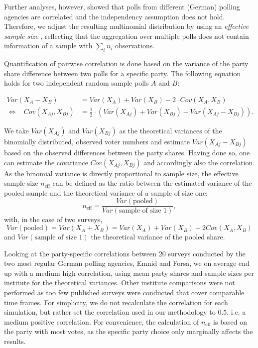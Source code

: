 \documentclass[smallcondensed]{svjour3}     %
\begin{document}
Further analyses, however, showed that polls from different (German)
polling agencies are correlated
and the independency assumption does not hold.
Therefore, we adjust the resulting multinomial
distribution by using an \textit{effective sample size} \citep{hanley_2003},
reflecting that the aggregation over multiple polls does not contain 
information of a sample with $\sum_i n_i$ observations.

Quantification of pairwise correlation is done based on the variance of the
party share difference between two polls for a specific party.
The following equation holds for two independent
random sample polls $A$ and $B$:

\begin{equation}
\begin{aligned}
Var(X_A - X_B) &= Var(X_A) + Var(X_B) - 2 \cdot Cov(X_A, X_B) \\
\Leftrightarrow \ \ \ \ Cov(X_{Aj}, X_{Bj}) &= \frac{1}{2} \cdot \left(Var(X_{Aj}) + Var(X_{Bj}) - Var(X_{Aj} - X_{Bj}) \right).
\end{aligned}
\end{equation}

We take $Var(X_{Aj})$ and $Var(X_{Bj})$ as the theoretical variances of the binomially distributed, observed voter numbers and estimate $Var(X_{Aj} - X_{Bj})$ based on the observed differences between the party shares. Having done so, one can estimate the covariance $Cov(X_{Aj}, X_{Bj})$ and accordingly also the correlation. As the binomial variance is directly proportional to sample size, the effective sample size $n_{\text{eff}}$ can be defined as the ratio between the estimated variance of the pooled sample and the theoretical variance of a sample of size one:
$$
n_{\text{eff}} = \frac{Var(\text{pooled})}{Var(\text{sample of size 1})},
$$
with, in the case of two surveys,
$$
Var(\text{pooled}) = Var(X_A + X_B) = Var(X_A) + Var(X_B) + 2 Cov(X_A,X_B)
$$
and $Var(\text{sample of size 1})$ the theoretical variance of the pooled share.

Looking at the party-specific correlations between 20 surveys conducted by the two most regular German polling agencies, Emnid and Forsa, we on average end up with a medium high correlation, using mean party shares and sample sizes per institute for the theoretical variances. Other institute comparisons were not performed as too few published surveys were conducted that cover comparable time frames. For simplicity, we do not recalculate the correlation for each simulation, but rather set the correlation used in our methodology to $0.5$, i.e. a medium positive correlation.
For convenience, the calculation of $n_{\text{eff}}$ is based on the party with most votes, as the specific party choice only marginally affects the results.
\end{document}
